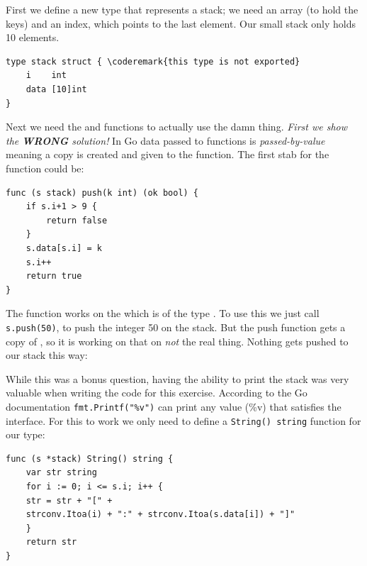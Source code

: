\begin{Answer}

\Question 
First we define a new type that represents a stack; we need an
array (to hold the keys) and an index, which points to the last element.
Our small stack only holds 10 elements.

\begin{lstlisting}
type stack struct { \coderemark{this type is not exported}
    i    int 
    data [10]int
}
\end{lstlisting}

Next we need the  and  functions to actually
use the damn thing. \emph{First we show the \textbf{WRONG} solution!}
In Go data passed to functions is \emph{passed-by-value} meaning a copy
is created and given to the function. The first stab for the function
 could be:

\begin{lstlisting}
func (s stack) push(k int) (ok bool) {
	if s.i+1 > 9 {
		return false
	}
	s.data[s.i] = k
	s.i++
	return true
}
\end{lstlisting}
The function works on the  which is of the type . To
use this we just call \lstinline{s.push(50)}, to push the integer 50 on
the stack. But the push function gets a copy of , so it is
working on that on \emph{not} the real thing. Nothing gets pushed to our
stack this way:


\Question While this was a bonus question, having the ability to print
the stack was very valuable when writing the code for this exercise.
According to the Go documentation \lstinline{fmt.Printf("%v")} can
print any value (\%v) that satisfies the  interface.
For this to work we only need to define a \lstinline{String() string} function for
our type:
\begin{lstlisting}
func (s *stack) String() string {
	var str string
	for i := 0; i <= s.i; i++ {
	str = str + "[" +
	strconv.Itoa(i) + ":" + strconv.Itoa(s.data[i]) + "]"
	}
	return str
}
\end{lstlisting}
\end{Answer}
